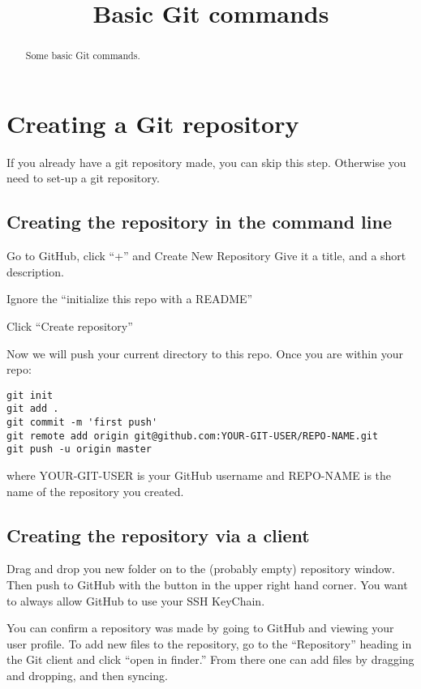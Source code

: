 \documentclass{ximera}
\title{Basic Git commands}
\begin{document}
\begin{abstract}
  Some basic Git commands.
\end{abstract}
\maketitle

\section{Creating a Git repository}

If you already have a git repository made, you can skip this
step. Otherwise you need to set-up a git repository.



\subsection{Creating the repository in the command line}

Go to GitHub, click ``+'' and Create New Repository Give it a title,
and a short description.

Ignore the ``initialize this repo with a README''

Click ``Create repository''

Now we will push your current directory to this repo. Once you are within your repo:

\begin{verbatim}
git init
git add .
git commit -m 'first push'
git remote add origin git@github.com:YOUR-GIT-USER/REPO-NAME.git
git push -u origin master
\end{verbatim}

where YOUR-GIT-USER is your GitHub username and REPO-NAME is the name
of the repository you created.


\subsection{Creating the repository via a client}

Drag and drop you new folder on to the (probably empty) repository
window. Then push to GitHub with the button in the upper right hand
corner. You want to always allow GitHub to use your SSH KeyChain.

You can confirm a repository was made by going to GitHub and viewing
your user profile. To add new files to the repository, go to the
``Repository'' heading in the Git client and click ``open in finder.''
From there one can add files by dragging and dropping, and then
syncing.
\end{document}
